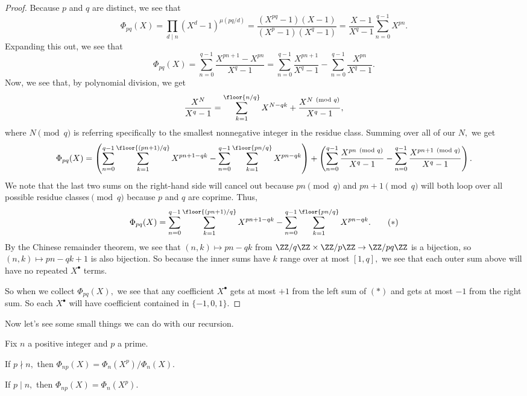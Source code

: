 \begin{proof}
	Because $p$ and $q$ are distinct, we see that
	\[\Phi_{pq}(X)=\prod_{d\mid n}\left(X^d-1\right)^{\mu(pq/d)}=\frac{\left(X^{pq}-1\right)(X-1)}{\left(X^p-1\right)\left(X^q-1\right)}=\frac{X-1}{X^q-1}\sum_{n=0}^{q-1}X^{pn}.\]
	Expanding this out, we see that
	\[\Phi_{pq}(X)=\sum_{n=0}^{q-1}\frac{X^{pn+1}-X^{pn}}{X^q-1}=\sum_{n=0}^{q-1}\frac{X^{pn+1}}{X^q-1}-\sum_{n=0}^{q-1}\frac{X^{pn}}{X^q-1}.\]
	Now, we see that, by polynomial division, we get
	\[\frac{X^N}{X^q-1}=\sum_{k=1}^{\floor{n/q}}X^{N-qk}+\frac{X^{N\pmod q}}{X^q-1},\]
	where $N\pmod q$ is referring specifically to the smallest nonnegative integer in the residue class. Summing over all of our $N,$ we get
	\[\Phi_{pq}(X)=\left(\sum_{n=0}^{q-1}\sum_{k=1}^{\floor{(pn+1)/q}}X^{pn+1-qk}-\sum_{n=0}^{q-1}\sum_{k=1}^{\floor{pn/q}}X^{pn-qk}\right)+\left(\sum_{n=0}^{q-1}\frac{X^{pn\pmod q}}{X^q-1}-\sum_{n=0}^{q-1}\frac{X^{pn+1\pmod q}}{X^q-1}\right).\]
	We note that the last two sums on the right-hand side will cancel out because $pn\pmod q$ and $pn+1\pmod q$ will both loop over all possible residue classes$\pmod q$ because $p$ and $q$ are coprime. Thus,
	\[\Phi_{pq}(X)=\sum_{n=0}^{q-1}\sum_{k=1}^{\floor{(pn+1)/q}}X^{pn+1-qk}-\sum_{n=0}^{q-1}\sum_{k=1}^{\floor{pn/q}}X^{pn-qk}.\tag{$*$}\]
	By the Chinese remainder theorem, we see that $(n,k)\mapsto pn-qk$ from $\ZZ/q\ZZ\times\ZZ/p\ZZ\to\ZZ/pq\ZZ$ is a bijection, so $(n,k)\mapsto pn-qk+1$ is also bijection. So because the inner sums have $k$ range over at most $[1,q],$ we see that each outer sum above will have no repeated $X^\bullet$ terms.

	So when we collect $\Phi_{pq}(X),$ we see that any coefficient $X^\bullet$ gets at most $+1$ from the left sum of $(*)$ and gets at most $-1$ from the right sum. So each $X^\bullet$ will have coefficient contained in $\{-1,0,1\}.$
\end{proof}
Now let's see some small things we can do with our recursion.
\begin{lemma} \label{lem:cyclocompute}
	Fix $n$ a positive integer and $p$ a prime.
	\begin{listalph}
		\item If $p\nmid n,$ then $\Phi_{np}(X)=\Phi_n\left(X^p\right)/\Phi_n(X).$
		\item If $p\mid n,$ then $\Phi_{np}(X)=\Phi_n\left(X^p\right).$
	\end{listalph}
\end{lemma}
